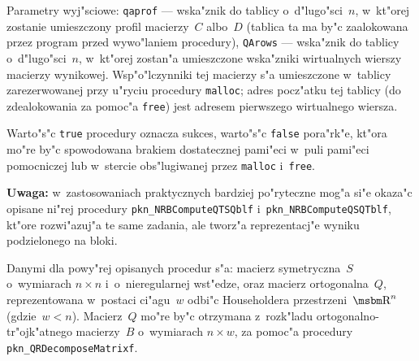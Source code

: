 Parametry wyj"sciowe: \texttt{qaprof} --- wska"znik do tablicy
o~d"lugo"sci~$n$, w~kt"orej zostanie umieszczony profil macierzy~$C$
albo~$D$ (tablica ta ma by"c zaalokowana przez program przed wywo"laniem
procedury), \texttt{QArows} --- wska"znik do tablicy o~d"lu\-go"s\-ci~$n$,
w~kt"orej zostan"a umieszczone wska"zniki wirtualnych wierszy
macierzy wynikowej. Wsp"o"lczynniki tej macierzy s"a umieszczone
w~tablicy zarezerwowanej przy u"ryciu procedury \texttt{malloc};
adres pocz"atku tej tablicy (do zdealokowania za pomoc"a \texttt{free})
jest adresem pierwszego wirtualnego wiersza.

Warto"s"c \texttt{true} procedury oznacza sukces, warto"s"c \texttt{false}
pora"rk"e, kt"ora mo"re by"c spowodowana brakiem dostatecznej
pami"eci w~puli pami"eci pomocniczej lub w~stercie obs"lugiwanej
przez \texttt{malloc} i~\texttt{free}.

\textbf{Uwaga:} w~zastosowaniach praktycznych bardziej po"ryteczne mog"a
si"e okaza"c opisane ni"rej procedury \texttt{pkn\_NRBComputeQTSQblf}
i~\texttt{pkn\_NRBComputeQSQTblf}, kt"ore rozwi"azuj"a te same zadania,
ale tworz"a reprezentacj"e wyniku podzielonego na bloki.


\vspace{\bigskipamount}
Danymi dla powy"rej opisanych procedur s"a: macierz symetryczna~$S$
o~wymiarach $n\times n$ i~o~nieregularnej wst"edze, oraz macierz
ortogonalna~$Q$, reprezentowana w~postaci ci"agu~$w$ odbi"c Householdera
przestrzeni~$\R^n$ (gdzie~$w<n$). Macierz~$Q$ mo"re by"c otrzymana
z~rozk"ladu ortogonalno-tr"ojk"atnego macierzy~$B$ o~wymiarach $n\times w$,
za pomoc"a procedury \texttt{pkn\_QRDecomposeMatrixf}.

